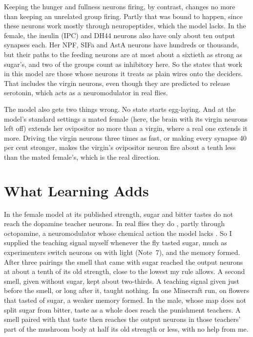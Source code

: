 \documentclass[11pt,a4paper]{article}
\newcommand{\note}[1]{(Note~#1)}
\begin{document}
Keeping the hunger and fullness neurons firing, by contrast, changes no more than keeping an unrelated group firing. Partly that was bound to happen, since these neurons work mostly through neuropeptides, which the model lacks. In the female, the insulin (IPC) and DH44 neurons also have only about ten output synapses each. Her NPF, SIFa and AstA neurons have hundreds or thousands, but their paths to the feeding neurons are at most about a sixtieth as strong as sugar's, and two of the groups count as inhibitory here. So the states that work in this model are those whose neurons it treats as plain wires onto the deciders. That includes the virgin neurons, even though they are predicted to release serotonin, which acts as a neuromodulator in real flies.

The model also gets two things wrong. No state starts egg-laying. And at the model's standard settings a mated female (here, the brain with its virgin neurons left off) extends her ovipositor no more than a virgin, where a real one extends it more. Driving the virgin neurons three times as fast, or making every synapse 40 per cent stronger, makes the virgin's ovipositor neuron fire about a tenth less than the mated female's, which is the real direction.

\section{What Learning Adds}
\label{sec:memory}

In the female model at its published strength, sugar and bitter tastes do not reach the dopamine teacher neurons. In real flies they do \citep{liu2012subset}, partly through octopamine, a neuromodulator whose chemical action the model lacks \citep{burke2012layered}. So I supplied the teaching signal myself whenever the fly tasted sugar, much as experimenters switch neurons on with light \note{7}, and the memory formed. After three pairings the smell that came with sugar reached the output neurons at about a tenth of its old strength, close to the lowest my rule allows. A second smell, given without sugar, kept about two-thirds. A teaching signal given just before the smell, or long after it, taught nothing. In one Minecraft run, on flowers that tasted of sugar, a weaker memory formed. In the male, whose map does not split sugar from bitter, taste as a whole does reach the punishment teachers. A smell paired with that taste then reaches the output neurons in those teachers' part of the mushroom body at half its old strength or less, with no help from me.
\end{document}
